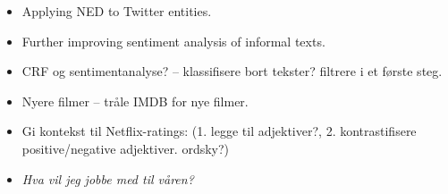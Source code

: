 \begin{itemize}
  \item Applying NED to Twitter entities.
  \item Further improving sentiment analysis of informal texts.
  \item CRF og sentimentanalyse? -- klassifisere bort tekster? filtrere i et første steg.
  \item Nyere filmer -- tråle IMDB for nye filmer.
  \item
    Gi kontekst til Netflix-ratings:
    (1. legge til adjektiver?, 2. kontrastifisere positive/negative adjektiver. ordsky?)

  \item \emph{Hva vil jeg jobbe med til våren?}
\end{itemize}

